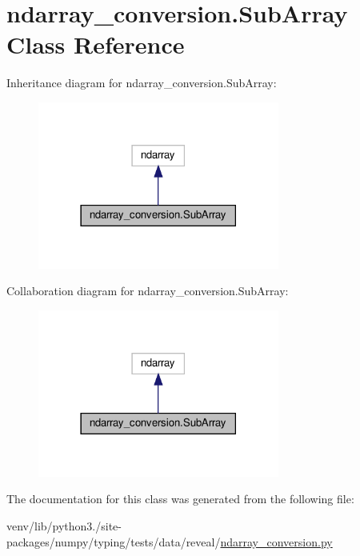 \hypertarget{classndarray__conversion_1_1SubArray}{}\section{ndarray\+\_\+conversion.\+Sub\+Array Class Reference}
\label{classndarray__conversion_1_1SubArray}


Inheritance diagram for ndarray\+\_\+conversion.\+Sub\+Array\+:
\nopagebreak
\begin{figure}[H]
\begin{center}
\leavevmode
\includegraphics[width=225pt]{classndarray__conversion_1_1SubArray__inherit__graph}
\end{center}
\end{figure}


Collaboration diagram for ndarray\+\_\+conversion.\+Sub\+Array\+:
\nopagebreak
\begin{figure}[H]
\begin{center}
\leavevmode
\includegraphics[width=225pt]{classndarray__conversion_1_1SubArray__coll__graph}
\end{center}
\end{figure}


The documentation for this class was generated from the following file\+:\begin{DoxyCompactItemize}
\item 
venv/lib/python3./site-\/packages/numpy/typing/tests/data/reveal/\hyperlink{reveal_2ndarray__conversion_8py}{ndarray\+\_\+conversion.\+py}\end{DoxyCompactItemize}
